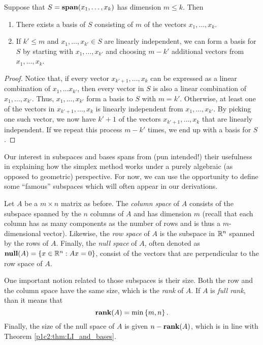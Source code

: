 \begin{theorem}\label{p1c2:thm:LI_and_bases}
	Suppose that $S = \mathop{\bf span}(x_1,\dots, x_k)$ has dimension $m \leq k$. Then
	\begin{enumerate}
		\item There exists a basis of $S$ consisting of $m$ of the vectors $x_1,\dots, x_k$.
		\item If $k' \leq m$ and $x_1,\dots, x_{k'} \in S$ are linearly independent, we can form a basis for $S$ by starting with $x_1,\dots, x_{k'}$ and choosing $m-{k'}$ additional vectors from $x_1,\dots, x_k$.
	\end{enumerate}	
\end{theorem}

\begin{proof}
	Notice that, if every vector $x_{k'+1}, \dots, x_{k}$ can be expressed as a linear combination of $x_{1},\dots x_{k'}$, then every vector in $S$ is also a linear combination of $x_{1}, \dots, x_{k'}$. Thus, $x_{1}, \dots, x_{k'}$ form a basis to $S$ with $m =k'$. Otherwise, at least one of the vectors in $x_{k'+1}, \dots, x_{k}$ is linearly independent from $x_{1}, \dots, x_{k'}$. By picking one such vector, we now have $k'+1$ of the vectors $x_{k'+1}, \dots, x_{k}$ that are linearly independent. If we repeat this process $m - k'$ times, we end up with a basis for $S$.
\end{proof}


Our interest in subspaces and bases spans from (pun intended!) their usefulness in explaining how the simplex method works under a purely algebraic (as opposed to geometric) perspective. For now, we can use the opportunity to define some ``famous'' subspaces which will often appear in our derivations. 

Let $A$ be a $m \times n$ matrix as before. The \emph{column space} of $A$ consists of the subspace spanned by the $n$ columns of $A$ and has dimension $m$ (recall that each column has as many components as the number of rows and is thus a $m$-dimensional vector). Likewise, the \emph{row space} of $A$ is the subspace in $\mathbb{R}^n$ spanned by the rows of $A$. Finally, the \emph{null space} of $A$, often denoted as $\mathop{\bf null}(A) = \left\{ x \in \mathbb{R}^n : Ax = 0 \right \}$, consist of the vectors that are perpendicular to the row space of $A$. 

One important notion related to those subspaces is their size. Both the row and the column space have the same size, which is the \emph{rank} of $A$. If $A$ is \emph{full rank}, than it means that 
%
\begin{equation*}
	\mathop{\bf rank}(A) = \min \left\{ m,n \right \}. 		
\end{equation*}
%
Finally, the size of the null space of $A$ is given $n - \mathop{\bf rank}(A)$, which is in line with Theorem \ref{p1c2:thm:LI_and_bases}.


